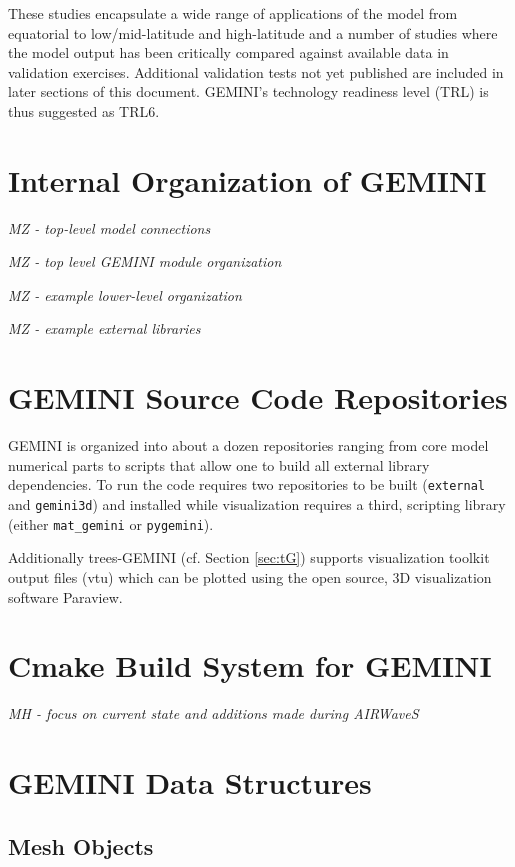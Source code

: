 \documentclass[11pt,letterpaper]{article}
\begin{document}
These studies encapsulate a wide range of applications of the model from equatorial to low/mid-latitude and high-latitude and a number of studies where the model output has been critically compared against available data in validation exercises.  Additional validation tests not yet published are included in later sections of this document.  GEMINI's technology readiness level (TRL) is thus suggested as TRL6.  

\section{Internal Organization of GEMINI}

\emph{MZ - top-level model connections}

\emph{MZ - top level GEMINI module organization}

\emph{MZ - example lower-level organization}

\emph{MZ - example external libraries}



\section{GEMINI Source Code Repositories}

GEMINI is organized into about a dozen repositories ranging from core model numerical parts to scripts that allow one to build all external library dependencies.  To run the code requires two repositories to be built (\texttt{external} and \texttt{gemini3d}) and installed while visualization requires a third, scripting library (either \texttt{mat\_gemini} or \texttt{pygemini}).  

Additionally trees-GEMINI (cf. Section \ref{sec:tG}) supports visualization toolkit output files (vtu) which can be plotted using the open source, 3D visualization software Paraview.  


\section{Cmake Build System for GEMINI}

\emph{MH - focus on current state and additions made during AIRWaveS}



\section{GEMINI Data Structures}

\subsection{Mesh Objects}
\end{document}
